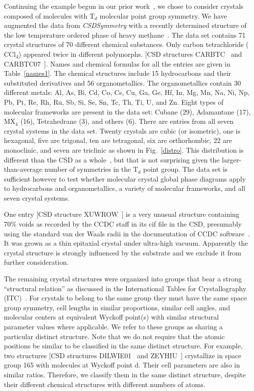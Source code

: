 \documentclass[preprint]{revtex4}              %
\begin{document}
Continuing the example begun in our prior work~\cite{Mettes04}, we
chose to consider crystals composed of molecules with T$_d$
molecular point group symmetry.  We have augmented the data from
\emph{CSDSymmetry} with a recently determined structure of the low
temperature ordered phase of heavy methane~\cite{Neumann03}.  The
data set contains 71 crystal structures of 70 different chemical
substances.  Only carbon tetrachloride ($\mathrm{CCl}_4$) appeared
twice in different polymorphs. [CSD structures
CARBTC~\cite{Piermarini73} and CARBTC07~\cite{Cohen79}]. Names and
chemical formulas for all the entries are given in
Table~\ref{names1}. The chemical structures include 15 hydrocarbons
and their substituted derivatives and 56 organometallics. The
organometallics contain 30 different metals: Al, As, Bi, Cd, Co, Cs,
Cu, Ga, Ge, Hf, In, Mg, Mn, Na, Ni, Np, Pb, Pt, Re, Rh, Ru, Sb, Si,
Se, Sn, Tc, Th, Ti, U, and Zn. Eight types of molecular frameworks
are present in the data set: Cubane (29), Adamantane (17), MX$_4$
(16), Tetrahedrane (3), and others (6). There are entries from all
seven crystal systems in the data set. Twenty crystals are cubic (or
isometric), one is hexagonal, five are trigonal, ten are tetragonal,
six are orthorhombic, 22 are monoclinic, and seven are triclinic as
shown in Fig.~\ref{distro}. This distribution is different than the
CSD as a whole~\cite{Bauer92}, but that is not surprising given the
larger-than-average number of symmetries in the T$_d$ point group.
The data set is sufficient however to test whether molecular crystal
global phase diagrams apply to hydrocarbons and organometallics, a
variety of molecular frameworks, and all seven crystal systems.

One entry [CSD structure XUWROW~\cite{sung02}] is a very unusual
structure containing 70\% voids as recorded by the CCDC staff in its
cif file in the CSD, presumably using the standard van der Waals
radii in the documentation of CCDC software~\cite{Bruno02}. It was
grown as a thin epitaxial crystal under ultra-high vacuum.
Apparently the crystal structure is strongly influenced by the
substrate and we exclude it from further consideration.

The remaining crystal structures were organized into groups that
bear a strong ``structural relation'' as discussed in the
International Tables for Crystallography (ITC)~\cite{Hahn83}. For
crystals to belong to the same group they must have the same space
group symmetry, cell lengths in similar proportions, similar cell
angles, and molecular centers at equivalent Wyckoff point(s) with
similar structural parameter values where applicable.  We refer to
these groups as sharing a particular distinct structure. Note that
we do not require that the atomic positions be similar to be
classified in the same distinct structure. For example, two
structures [CSD structures DILWIE01~\cite{Ebert98} and
ZEYHIU~\cite{Noth95}] crystallize in space group 165 with molecules
at Wyckoff point d. Their cell parameters are also in similar
ratios. Therefore, we classify them in the same distinct structure,
despite their different chemical structures with different numbers
of atoms.
\end{document}
